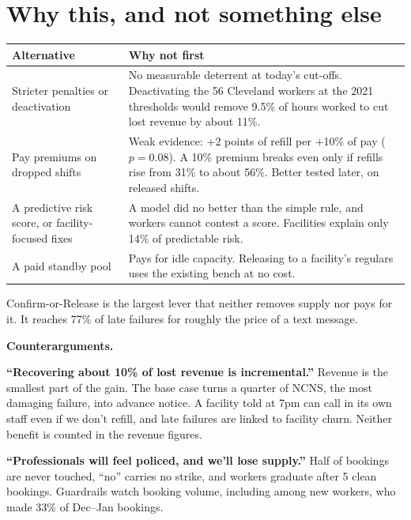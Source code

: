 \documentclass[11pt]{article}
\begin{document}
\section{Why this, and not something else}

\begin{center}\small
{}
\begin{tabularx}{\textwidth}{@{}P{0.24\textwidth}L@{}}
\toprule
Alternative & Why not first \\
\midrule
Stricter penalties or deactivation & No measurable deterrent at today's cut-offs. Deactivating the 56 Cleveland workers
at the 2021 thresholds would remove 9.5\% of hours worked to cut lost revenue by about 11\%. \\
Pay premiums on dropped shifts & Weak evidence: +2 points of refill per +10\% of pay ($p=0.08$). A 10\% premium breaks
even only if refills rise from 31\% to about 56\%. Better tested later, on released shifts. \\
A predictive risk score, or facility-focused fixes & A model did no better than the simple rule, and workers cannot
contest a score. Facilities explain only 14\% of predictable risk. \\
A paid standby pool & Pays for idle capacity. Releasing to a facility's regulars uses the existing bench at no cost. \\
\bottomrule
\end{tabularx}
\end{center}

Confirm-or-Release is the largest lever that neither removes supply nor pays for it. It reaches 77\% of late failures for
roughly the price of a text message.

\textbf{Counterarguments.}

\textbf{``Recovering about 10\% of lost revenue is incremental.''} Revenue is the smallest part of the gain. The base
case turns a quarter of NCNS, the most damaging failure, into advance notice. A facility told at 7pm can call in its own
staff even if we don't refill, and late failures are linked to facility churn. Neither benefit is counted in the revenue
figures.

\textbf{``Professionals will feel policed, and we'll lose supply.''} Half of bookings are never touched, ``no'' carries
no strike, and workers graduate after 5 clean bookings. Guardrails watch booking volume, including among new workers, who
made 33\% of Dec--Jan bookings.
\end{document}
